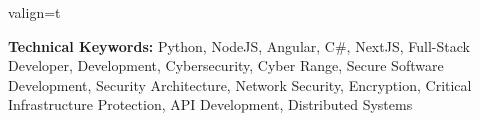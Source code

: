 \documentclass[a4paper,10pt]{article}
\newcommand{\MySkip}{
\vskip12pt
}
\begin{document}
\begin{adjustbox}{valign=t}
\begin{minipage}{0.6\textwidth}
\vfill
{\color{white}
\textbf{Technical Keywords:} Python, NodeJS, Angular, C\#, NextJS, Full-Stack Developer, Development, Cybersecurity, Cyber Range, Secure Software Development, Security Architecture, Network Security, 
Encryption, Critical Infrastructure Protection, API Development, Distributed Systems
}

\MySkip
\end{minipage}
\end{adjustbox}
\end{document}
